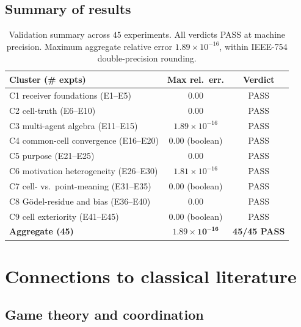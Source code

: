 \documentclass[11pt,twocolumn,a4paper]{article}
\begin{document}
\subsection{Summary of results}

\begin{table}[h!]\centering
\begin{tabular}{lcc}
\toprule
\textbf{Cluster (\# expts)} & \textbf{Max rel.\ err.} & \textbf{Verdict}\\\midrule
C1 receiver foundations (E1--E5)     & $0.00$                       & PASS\\
C2 cell-truth (E6--E10)              & $0.00$                       & PASS\\
C3 multi-agent algebra (E11--E15)    & $1.89\times 10^{-16}$        & PASS\\
C4 common-cell convergence (E16--E20)& $0.00$ (boolean)             & PASS\\
C5 purpose (E21--E25)                & $0.00$                       & PASS\\
C6 motivation heterogeneity (E26--E30)& $1.81\times 10^{-16}$       & PASS\\
C7 cell- vs.\ point-meaning (E31--E35)& $0.00$ (boolean)             & PASS\\
C8 Gödel-residue and bias (E36--E40)  & $0.00$                       & PASS\\
C9 cell exteriority (E41--E45)        & $0.00$ (boolean)             & PASS\\\midrule
\textbf{Aggregate (45)}              & $\mathbf{1.89\times 10^{-16}}$ & \textbf{45/45 PASS}\\\bottomrule
\end{tabular}
\caption{Validation summary across $45$ experiments. All verdicts PASS
at machine precision. Maximum aggregate relative error
$1.89\times 10^{-16}$, within IEEE-754 double-precision rounding.}
\label{tab:validation}
\end{table}



\section{Connections to classical literature}
\label{sec:connections}

\subsection{Game theory and coordination}
\end{document}

